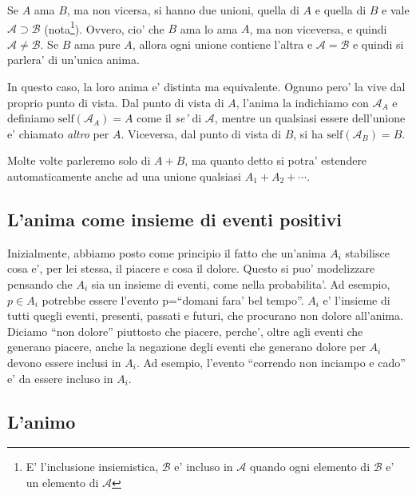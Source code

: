 \def\self{\textrm{self}}
\def\other{\textrm{other}}

Se $A$ ama $B$, ma non vicersa, si hanno due unioni, quella di $A$ e quella di $B$ e vale $\mathcal{A} \supset \mathcal{B}$ (nota\footnote{E' l'inclusione insiemistica, $\mathcal{B}$ e' incluso in $\mathcal{A}$ quando ogni elemento di $\mathcal{B}$ e' un elemento di $\mathcal{A}$}).  Ovvero, cio' che $B$ ama lo ama $A$, ma non viceversa, e quindi $\mathcal{A} \neq \mathcal{B}$. Se $B$ ama pure $A$, allora ogni unione contiene l'altra e $\mathcal{A} = \mathcal{B}$ e quindi si parlera' di un'unica anima. 

In questo caso, la loro anima e' distinta ma equivalente.  Ognuno pero' la vive dal proprio punto di vista. Dal punto di vista di $A$, l'anima la indichiamo con $\mathcal{A}_A$ e definiamo $\textrm{self}(\mathcal{A}_A)=A$ come il \emph{se'} di $\mathcal{A}$, mentre un qualsiasi essere dell'unione e' chiamato \emph{altro} per $A$. Viceversa, dal punto di vista di $B$, si ha $\textrm{self}(\mathcal{A}_B)=B$.

Molte volte parleremo solo di $A+B$, ma quanto detto si potra' estendere automaticamente anche ad una unione qualsiasi $A_1+A_2+\cdots$. \\

\subsection{L'anima come insieme di eventi positivi}
\label{AnimaInsiemeEventi}
Inizialmente, abbiamo posto come principio il fatto che un'anima $A_i$ stabilisce cosa e', per lei stessa, il piacere e cosa il dolore. Questo si puo' modelizzare pensando che $A_i$ sia un insieme di eventi, come nella probabilita'. Ad esempio, $p\in A_i$ potrebbe essere l'evento p=``domani fara' bel tempo''. $A_i$ e' l'insieme di tutti quegli eventi, presenti, passati e futuri, che procurano non dolore all'anima. Diciamo ``non dolore'' piuttosto che piacere, perche', oltre agli eventi che generano piacere, anche la negazione degli eventi che generano dolore per $A_i$ devono essere inclusi in $A_i$. Ad esempio, l'evento ``correndo non inciampo e cado'' e' da essere incluso in $A_i$.


\subsection{L'animo}

\def\des{\textrm{des}}
\label{defDiDesideriDes}

